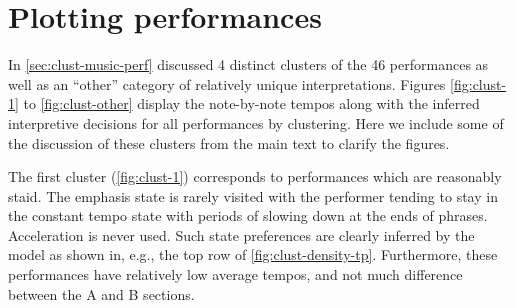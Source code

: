 \documentclass[12pt]{article}
\begin{document}
\hypertarget{plotting-performances}{%
\section{Plotting performances}\label{plotting-performances}}

In \autoref{sec:clust-music-perf} discussed 4 distinct clusters of the
46 performances as well as an ``other'' category of relatively unique
interpretations. Figures \ref{fig:clust-1} to \ref{fig:clust-other}
display the note-by-note tempos along with the inferred interpretive
decisions for all performances by clustering. Here we include some of
the discussion of these clusters from the main text to clarify the
figures.

The first cluster (\autoref{fig:clust-1}) corresponds to performances
which are reasonably staid. The emphasis state is rarely visited with
the performer tending to stay in the constant tempo state with periods
of slowing down at the ends of phrases. Acceleration is never used. Such
state preferences are clearly inferred by the model as shown in, e.g.,
the top row of \autoref{fig:clust-density-tp}. Furthermore, these
performances have relatively low average tempos, and not much difference
between the A and B sections.
\end{document}
